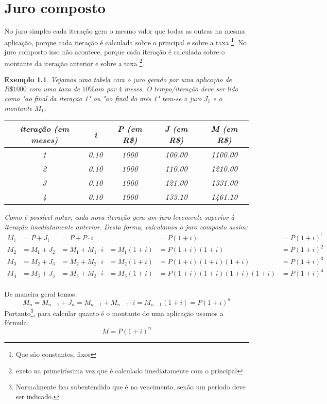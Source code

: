 \documentclass{book}
\theoremstyle{definition}
\theoremstyle{remark}
\theoremstyle{plain}
\theoremstyle{plain}
\theoremstyle{plain}
\theoremstyle{plain}
\newtheorem{example}{Exemplo}
\begin{document}
    \chapter{Juro composto}
    No juro simples cada iteração gera o mesmo valor que todas as outras na mesma aplicação,
    porque cada iteração é calculada sobre o principal e sobre a taxa \footnote{Que são constantes, fixos}. 
    No juro composto isso não acontece, porque cada iteração é calculada sobre o montante da iteração anterior 
    e sobre a taxa
    \footnote{exeto na primeiríssima vez que é calculado imediatamente com o principal}.
    \begin{example}
        Vejamos uma tabela com o juro gerado por uma aplicação de $R\$ \num{1000}$ com uma taxa de $10\%am$ por $4$ meses.
        O tempo/iteração deve ser lido como "ao final da iteração 1" ou "ao final do mês 1" tem-se o juro $J_1$ e 
        o montante $M_1$.
        \begin{center}
           \begin{tabular}{|c|c|c|c|c|}
               \hline
               iteração (em meses) & i             & P (em R\$)       & J (em R\$)       & M (em R\$) \\
               \hline
               1        & \num{0.10}    & \num{1000}    & \num{100.00}     & \num{1100.00} \\
               2        & \num{0.10}    & \num{1000}    & \num{110.00}     & \num{1210.00} \\
               3        & \num{0.10}    & \num{1000}    & \num{121.00}     & \num{1331.00} \\
               4        & \num{0.10}    & \num{1000}    & \num{133.10}     & \num{1461.10} \\
               \hline
           \end{tabular}
        \end{center}
        Como é possível notar, cada nova iteração gera um juro levemente superior à iteração imediatamente anterior.
        Desta forma, calculamos o juro composto assim:
        \begin{align*}
            M_1 &= P   + J_1    &= P + P \cdot i       &                   &= P(1+i)                &= P(1+i)^1 \\
            M_2 &= M_1 + J_2    &= M_1 + M_1 \cdot i   &= M_1 (1 + i)      &= P(1+i)(1+i)           &= P(1+i)^2 \\
            M_3 &= M_2 + J_3    &= M_2 + M_2 \cdot i   &= M_2 (1 + i)      &= P(1+i)(1+i)(1+i)      &= P(1+i)^3 \\
            M_4 &= M_3 + J_4    &= M_3 + M_3 \cdot i   &= M_3 (1 + i)      &= P(1+i)(1+i)(1+i)(1+i) &= P(1+i)^4 \\
        \end{align*}
    \end{example}
        De maneira geral temos: 
        $$ M_n = M_{n-1} + J_n = M_{n-1} + M_{n-1} \cdot i = M_{n-1}(1 + i) = P(1+i)^n $$
        Portanto\footnote{Normalmente fica subentendido que é no vencimento, senão um período deve ser indicado.}, 
        para calcular quanto é o montante de uma aplicação usamos a fórmula: 
        $$M = P (1+i)^n$$
        
\end{document}
